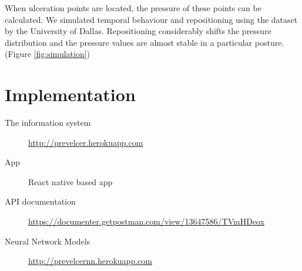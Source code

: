 When ulceration points are located, the pressure of these points can be calculated. We simulated temporal behaviour and repositioning using the dataset by the University of Dallas. Repositioning considerably shifts the pressure distribution and the pressure values are almost stable in a particular posture. (Figure \ref{fig:simulation})



\section{Implementation}

\begin{description}
    \item[The information system]   \url{http://prevelcer.herokuapp.com}
    \item[App] React native based app
    \item[API documentation] \url{https://documenter.getpostman.com/view/13647586/TVmHDeox}
    \item[Neural Network Models] \url{http://prevelcernn.herokuapp.com}
\end{description}




